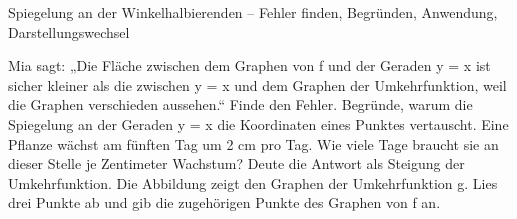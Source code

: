\begin{aufgabe}{Spiegelung an der Winkelhalbierenden – Fehler finden, Begründen, Anwendung, Darstellungswechsel}
\begin{teile}
\teil Mia sagt: „Die Fläche zwischen dem Graphen von f und der Geraden y = x ist sicher kleiner als die zwischen y = x und dem Graphen der Umkehrfunktion, weil die Graphen verschieden aussehen.“ Finde den Fehler.
\teil Begründe, warum die Spiegelung an der Geraden y = x die Koordinaten eines Punktes vertauscht.
\teil Eine Pflanze wächst am fünften Tag um 2 cm pro Tag. Wie viele Tage braucht sie an dieser Stelle je Zentimeter Wachstum? Deute die Antwort als Steigung der Umkehrfunktion.
\teil Die Abbildung zeigt den Graphen der Umkehrfunktion g. Lies drei Punkte ab und gib die zugehörigen Punkte des Graphen von f an.

\begin{ksys}[xmin=-1,xmax=6,ymin=-3,ymax=6,ablesen]   \end{ksys}
\end{teile}
\end{aufgabe}
